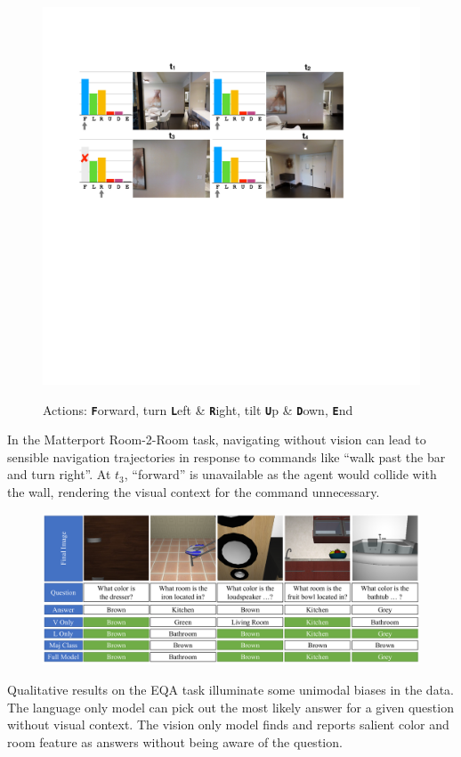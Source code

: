 \documentclass[final]{beamer}
\newcommand{\setblocksize}{\LARGE \centering}
\newcommand{\paragraphbreak}{\vspace{1cm}}
\begin{document}
\begin{frame}{}
\begin{columns}[t]
\begin{column}{.49\linewidth}
\begin{block}{\setblocksize }
{\begin{figure}[t]
\centering
\includegraphics[width=\columnwidth]{figures/Figure1_noLabels.pdf}\\
\vspace{-5pt}\begin{small}Actions: \textbf{\texttt{F}}orward, turn \textbf{\texttt{L}}eft \& \textbf{\texttt{R}}ight, tilt \textbf{\texttt{U}}p \& \textbf{\texttt{D}}own, \textbf{\texttt{E}}nd\end{small}
\end{figure}
In the Matterport Room-2-Room task, navigating without vision can lead to sensible navigation trajectories in response to commands like ``walk past the bar and turn right''.
At $t_3$, ``forward'' is unavailable as the agent would collide with the wall, rendering the visual context for the command unnecessary.
\paragraphbreak

\begin{figure}
\centering
\includegraphics[width=\linewidth]{figures/EQA_samples_1col_4.pdf}
\end{figure}
Qualitative results on the EQA task illuminate some unimodal biases in the data.
The language only model can pick out the most likely answer for a given question without visual context.
The vision only model finds and reports salient color and room feature as answers without being aware of the question.

}
\end{block}
\end{column}
\end{columns}
\end{frame}
\end{document}
